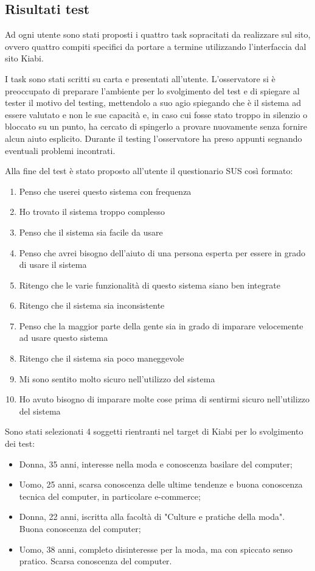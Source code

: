 \documentclass[12pt,italian,]{report}
\providecommand{\tightlist}{%
  \setlength{\itemsep}{0pt}\setlength{\parskip}{0pt}}
\begin{document}
\hypertarget{risultati-test}{%
\subsection{Risultati test}\label{risultati-test}}

Ad ogni utente sono stati proposti i quattro task sopracitati da realizzare sul sito, ovvero quattro compiti specifici da portare a termine utilizzando l'interfaccia dal sito Kiabi. 

I task sono stati scritti su carta e presentati all'utente.
L'osservatore si è preoccupato di preparare l'ambiente per lo
svolgimento del test e di spiegare al tester il motivo del testing,
mettendolo a suo agio spiegando che è il sistema ad essere valutato e
non le sue capacità e, in caso cui fosse stato troppo in silenzio o
bloccato su un punto, ha cercato di spingerlo a provare nuovamente senza
fornire alcun aiuto esplicito. Durante il testing l'osservatore ha preso
appunti segnando eventuali problemi incontrati.

Alla fine del test è stato proposto all'utente il questionario SUS così
formato:

\begin{enumerate}
\def\labelenumi{\arabic{enumi}.}
\tightlist
\item
  Penso che userei questo sistema con frequenza
\item
  Ho trovato il sistema troppo complesso
\item
  Penso che il sistema sia facile da usare
\item
  Penso che avrei bisogno dell'aiuto di una persona esperta per essere
  in grado di usare il sistema
\item
  Ritengo che le varie funzionalità di questo sistema siano ben
  integrate
\item
  Ritengo che il sistema sia inconsistente
\item
  Penso che la maggior parte della gente sia in grado di imparare
  velocemente ad usare questo sistema
\item
  Ritengo che il sistema sia poco maneggevole
\item
  Mi sono sentito molto sicuro nell'utilizzo del sistema
\item
  Ho avuto bisogno di imparare molte cose prima di sentirmi sicuro nell'utilizzo del sistema
\end{enumerate}

Sono stati selezionati 4 soggetti rientranti nel target di Kiabi per lo svolgimento dei test: 
\begin{itemize}
\item Donna, 35 anni, interesse nella moda e conoscenza basilare del computer;
\item Uomo, 25 anni, scarsa conoscenza delle ultime tendenze e buona conoscenza tecnica del computer, in particolare e-commerce;
\item Donna, 22 anni, iscritta alla facoltà di "Culture e pratiche della moda". Buona conoscenza del computer;
\item Uomo, 38 anni, completo disinteresse per la moda, ma con spiccato senso pratico. Scarsa conoscenza del computer.
\end{itemize} 
\end{document}
